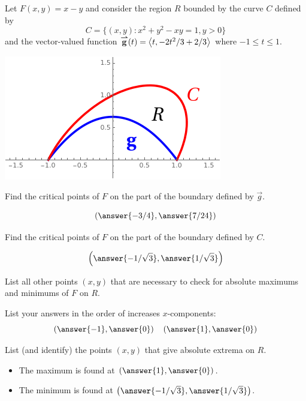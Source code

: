 \documentclass{ximera}
\author{Bart Snapp \and Darry Andrews}
\begin{document}

Let $F(x,y) = x-y$ and consider the region $R$ bounded by the
curve $C$ defined by
\[
C=\{(x,y): x^2+y^2-xy=1, y>0\}
\]
and the vector-valued function ${\overset{\boldsymbol{\rightharpoonup}}{\mathbf{g}}}(t) = \left\langle t,-2t^2/3+2/3\right\rangle$ where
$-1\le t \le 1$.
\begin{image}[3in]
  \includegraphics{optGraphics.png}
\end{image}





\begin{problem}
Find the critical points of $F$ on the part of the boundary defined by
$\vec{g}$.
\begin{prompt}
  \[
  \left(\answer{-3/4}, \answer{7/24}\right)
  \]
\end{prompt}
\vfill
\end{problem}


\begin{problem}
Find the critical points of $F$ on the part of the boundary defined by
$C$.
\begin{prompt}
  \[
  \left(\answer{-1/\sqrt{3}}, \answer{1/\sqrt{3}}\right)
  \]
\end{prompt}
\vfill
\end{problem}

\begin{problem}
  List all other points $(x,y)$ that are necessary to check for
  absolute maximums and minimums of $F$ on $R$.
  \begin{prompt}
    List your answers in the order of increases $x$-components:
    \[
    \left(\answer{-1},\answer{0}\right)\quad\left(\answer{1},\answer{0}\right)
    \]
  \end{prompt}
  \vfill
\end{problem}

\begin{problem}
  List (and identify) the points $(x,y)$ that give absolute extrema on
  $R$.
  \begin{prompt}
    \begin{itemize}
    \item The maximum is found at $\left(\answer{1},\answer{0}\right)$.
    \item The minimum is found at $\left(\answer{-1/\sqrt{3}},\answer{1/\sqrt{3}}\right)$.
    \end{itemize}
  \end{prompt}
  \vfill
\end{problem}
\end{document}
